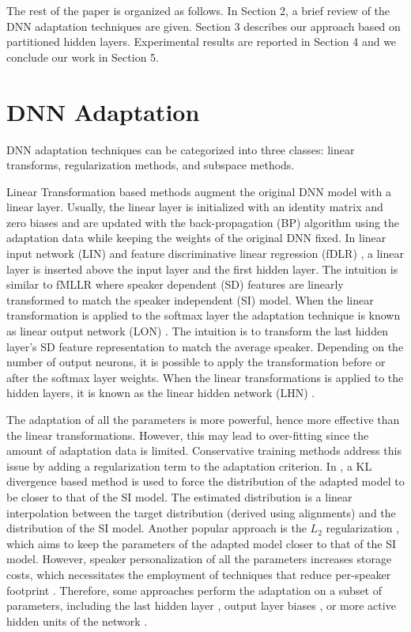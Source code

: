 \documentclass[a4paper]{article}
\begin{document}
    
    The rest of the paper is organized as follows. In Section 2, a brief review of the DNN adaptation techniques are given. Section 3 describes our approach based on partitioned hidden layers. Experimental results are reported in Section 4 and we conclude our work in Section 5. 

  
 
 \section{DNN Adaptation}
 

 DNN adaptation techniques can be categorized into three classes: linear transforms, regularization methods, and subspace methods.
 
 Linear Transformation based methods augment the original DNN model with a linear layer. Usually, the linear layer is initialized with an identity matrix and zero biases and are updated with the back-propagation (BP) algorithm using the adaptation data while keeping the weights of the original DNN fixed. In linear input network (LIN) \cite{LIN1}\cite{LIBO} and feature discriminative linear regression (fDLR) \cite{FDLR}, a linear layer is inserted above the input layer and the first hidden layer. The intuition is similar to fMLLR \cite{MLLR} where speaker dependent (SD) features are linearly transformed to match the speaker independent (SI) model. When the linear transformation is applied to the softmax layer the adaptation technique is known as linear output network (LON) \cite{LIBO}. The intuition is to transform the last hidden layer's SD feature representation to match the average speaker. Depending on the number of output neurons, it is possible to apply the transformation before or after the softmax layer weights. When the linear transformations is applied to the hidden layers, it is known as the linear hidden network (LHN) \cite{LHN}. 
 
 The adaptation of all the parameters is more powerful, hence more effective than the linear transformations. However, this may lead to over-fitting since the amount of adaptation data is limited. Conservative training methods address this issue by adding a regularization term to the adaptation criterion. In \cite{KLDNN}, a KL divergence based method is used to force the distribution of the adapted model to be closer to that of the SI model. The estimated distribution is a linear interpolation between the target distribution (derived using alignments) and the distribution of the SI model. Another popular approach is the $L_2$ regularization \cite{L2}, which aims to keep the parameters of the adapted model closer to that of the SI model. However, speaker personalization of all the parameters increases storage costs, which necessitates the employment of techniques that reduce per-speaker footprint \cite{FOOTPRINT}.  Therefore, some approaches perform the adaptation on a subset of parameters, including the last hidden layer \cite{RLL}, output layer biases \cite{OUTBIASES}, or more active hidden units of the network \cite{RLL}. 
 
\end{document}
